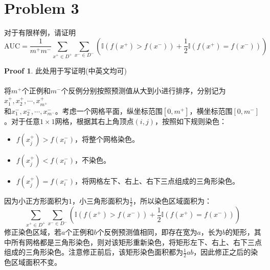 \documentclass[a4paper,UTF8]{article}
\theoremstyle{definition}
\newtheorem*{prove}{Proof}
\begin{document}
\section*{Problem 3}
对于有限样例，请证明
\[
\text{AUC} = \frac{1}{m^+m^-}\sum_{x^+\in D^+}\sum_{x^-\in D^-}\left(\mathbb{I}(f(x^+)>f(x^-))+\frac{1}{2}\mathbb{I}(f(x^+)=f(x^-))\right)
\]

\begin{prove}
此处用于写证明(中英文均可)
~\\
~\\
将$m^+$个正例和$m^-$个反例分别按照预测值从大到小进行排序，分别记为$x_1^+,x_2^+,\cdots,x_{m^+}^+$\\和$x_1^-,x_2^-,\cdots,x_{m^-}^-$。考虑一个网格平面，纵坐标范围$[0,m^+]$，横坐标范围$[0,m^-]$。对于任意$1\times1$网格，根据其右上角顶点$(i,j)$，按照如下规则染色：
\begin{itemize}
\item $f(x_j^+)>f(x_i^-)$，将整个网格染色。
\item $f(x_j^+)<f(x_i^-)$，不染色。
\item $f(x_j^+)=f(x_i^-)$，将网格左下、右上、右下三点组成的三角形染色。
\end{itemize}
因为小正方形面积为$1$，小三角形面积为$\frac12$，所以染色区域面积为：
\[\sum_{x^+\in D^+}\sum_{x^-\in D^-}\left(\mathbb{I}(f(x^+)>f(x^-))+\frac{1}{2}\mathbb{I}(f(x^+)=f(x^-))\right)\]
修正染色区域，若$a$个正例和$b$个反例预测值相同，即存在宽为$a$，长为$b$的矩形，其中所有网格都是三角形染色，则对该矩形重新染色，将矩形左下、右上、右下三点组成的三角形染色。注意修正前后，该矩形染色面积都为$\frac12ab$，因此修正之后的染色区域面积不变。
\begin{figure}[h]
	\centering

\end{figure}
\end{prove}
\end{document}
